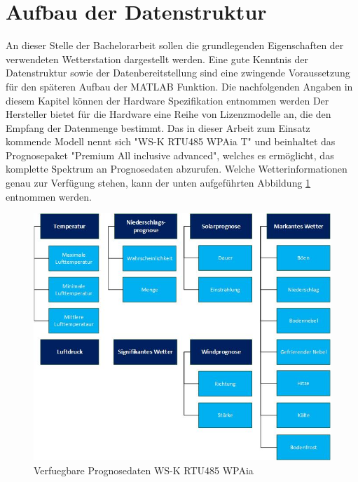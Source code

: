 \section{Aufbau der Datenstruktur}
An dieser Stelle der Bachelorarbeit sollen die grundlegenden Eigenschaften der verwendeten Wetterstation dargestellt werden. Eine gute Kenntnis der Datenstruktur sowie der Datenbereitstellung sind eine zwingende Voraussetzung für den späteren Aufbau der MATLAB Funktion. Die nachfolgenden Angaben in diesem Kapitel können der Hardware Spezifikation entnommen werden \cite{HKWDoc} Der Hersteller bietet für die Hardware eine Reihe von Lizenzmodelle an, die den Empfang der Datenmenge bestimmt. Das in dieser Arbeit zum Einsatz kommende Modell nennt sich "{}WS-K RTU485 WPAia T"{} und beinhaltet das Prognosepaket "Premium All inclusive advanced", welches es ermöglicht, das komplette Spektrum an Prognosedaten abzurufen. Welche Wetterinformationen genau zur Verfügung stehen, kann der unten aufgeführten Abbildung \ref{fig:datenstrukt} entnommen werden.
\begin{figure}[h]
\centering
\includegraphics[scale=0.65]{weatherstation/Datenuebersicht}
\caption{Verfuegbare Prognosedaten WS-K RTU485 WPAia}
\label{fig:datenstrukt}
\end{figure}

